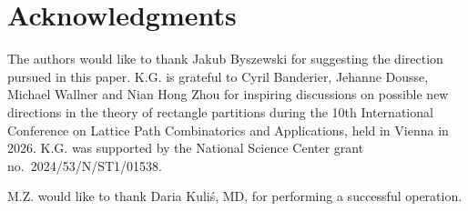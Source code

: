 \documentclass[12pt,a4paper]{amsart}
\numberwithin{equation}{section}
\theoremstyle{plain}
\theoremstyle{definition}
\theoremstyle{remark}
\begin{document}
\section*{Acknowledgments}
The authors would like to thank Jakub Byszewski for suggesting the direction pursued in this paper. K.G. is grateful to Cyril Banderier, Jehanne Dousse, Michael Wallner and Nian Hong Zhou for inspiring discussions on possible new directions in the theory of rectangle partitions during the 10th International Conference on Lattice Path Combinatorics and Applications, held in Vienna in 2026. K.G. was supported by the National Science Center grant no.~2024/53/N/ST1/01538.

M.Z. would like to thank Daria Kuliś, MD, for performing a successful operation.


\end{document}
